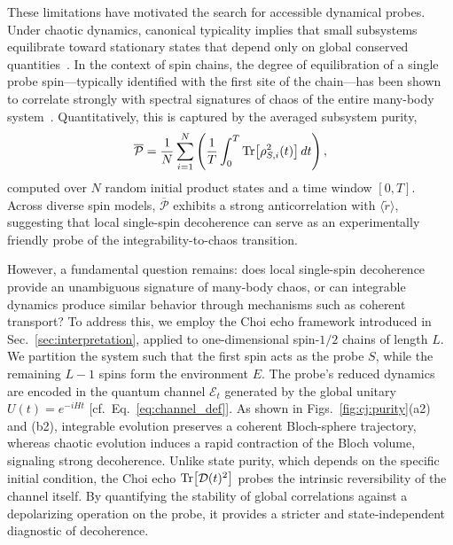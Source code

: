 \documentclass[pra,twocolumn,aps,showpacs,superscriptaddress,longbibliography]{revtex4-2}%
\providecommand{\DIFadd}[1]{{\protect\color{blue} \sf #1}} %
\providecommand{\DIFdel}[1]{{\protect\color{red} \scriptsize #1}} %
\providecommand{\DIFaddbegin}{} %
\providecommand{\DIFaddend}{} %
\providecommand{\DIFdelbegin}{} %
\providecommand{\DIFdelend}{} %
\begin{document}
These limitations have motivated the search for accessible dynamical probes. Under chaotic dynamics, canonical typicality implies that small subsystems equilibrate toward stationary states that depend only on global conserved quantities~\cite{goldstein_2006_canonical, rigol_2008_thermalization}. In the context of spin chains, the degree of equilibration of a single probe spin---typically identified with the first site of the chain---has been shown to correlate strongly with spectral signatures of chaos of the entire many-body system~\cite{mirkin_2021_quantum}. Quantitatively, this is captured by the averaged subsystem purity,
\begin{equation}\label{eq:avg:P}
\overline{\mathcal{P}}=\frac{1}{N}\sum_{i=1}^N
\left(\frac{1}{T}\int_0^T \Tr[\rho_{S,i}^2(t)]\,dt\right),
\end{equation}
computed over $N$ random initial product states and a time window $[0,T]$. Across diverse spin models, $\overline{\mathcal{P}}$ exhibits a strong anticorrelation with $\langle \tilde{r} \rangle$, suggesting that \DIFdelbegin \DIFdel{local }\DIFdelend \DIFaddbegin \DIFadd{single-spin }\DIFaddend decoherence can serve as an experimentally friendly probe of the integrability-to-chaos transition.

However, a fundamental question remains: does \DIFdelbegin \DIFdel{local }\DIFdelend \DIFaddbegin \DIFadd{single-spin }\DIFaddend decoherence provide an unambiguous signature of many-body chaos, or can integrable dynamics produce similar behavior through mechanisms such as coherent transport? To address this, we employ the Choi echo framework introduced in Sec.~\ref{sec:interpretation}, applied to one-dimensional spin-$1/2$ chains of length $L$. We partition the system such that the first spin acts as the probe $S$, while the remaining $L-1$ spins form the environment $E$. The probe’s reduced dynamics are encoded in the quantum channel $\mathcal{E}_t$ generated by the global unitary $U(t)=e^{-iHt}$ [cf.~Eq.~\eqref{eq:channel_def}]. As shown in Figs.~\ref{fig:cj:purity}(a2) and (b2), integrable evolution preserves a coherent Bloch-sphere trajectory, whereas chaotic evolution induces a rapid contraction of the Bloch volume, signaling strong decoherence. Unlike state purity, which depends on the specific initial condition, the Choi echo $\Tr[\mathcal{D}(t)^2]$ probes the intrinsic reversibility of the channel itself. By quantifying the stability of global correlations against a depolarizing operation on the probe, it provides a stricter and state-independent diagnostic of decoherence.
\end{document}

